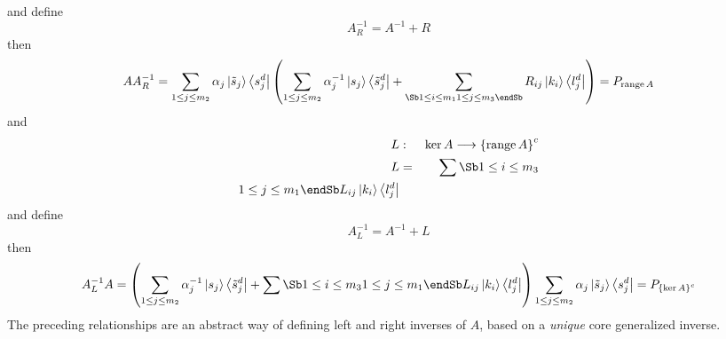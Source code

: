 and define 
\begin{equation}
A_{R}^{-1}=A^{-1}+R
\end{equation}%
then 
\begin{equation}
AA_{R}^{-1}=\sum_{1\leq j\leq m_{2}}\alpha _{j}\left\vert \tilde{s}%
_{j}\right\rangle \left\langle s_{j}^{d}\right\vert \left( \sum_{1\leq j\leq
m_{2}}\alpha _{j}^{-1}\left\vert s_{j}\right\rangle \left\langle \tilde{s}%
_{j}^{d}\right\vert +\sum_{\Sb 1\leq i\leq m_{1}  \\ 1\leq j\leq m_{3} 
\endSb }R_{ij}\left\vert k_{i}\right\rangle \left\langle
l_{j}^{d}\right\vert \right) =P_{%
\mathop{\rm range}%
A}
\end{equation}%
and 
\begin{eqnarray}
L &:&\ker A\longrightarrow \left\{ 
\mathop{\rm range}%
A\right\} ^{c}  \nonumber \\
L &=&\sum\Sb 1\leq i\leq m_{3}  \\ 1\leq j\leq m_{1}  \endSb %
L_{ij}\left\vert k_{i}\right\rangle \left\langle l_{j}^{d}\right\vert
\end{eqnarray}%
and define 
\begin{equation}
A_{L}^{-1}=A^{-1}+L
\end{equation}%
then 
\begin{equation}
A_{L}^{-1}A=\left( \sum_{1\leq j\leq m_{2}}\alpha _{j}^{-1}\left\vert
s_{j}\right\rangle \left\langle \tilde{s}_{j}^{d}\right\vert +\sum\Sb 1\leq
i\leq m_{3}  \\ 1\leq j\leq m_{1}  \endSb L_{ij}\left\vert
k_{i}\right\rangle \left\langle l_{j}^{d}\right\vert \right) \sum_{1\leq
j\leq m_{2}}\alpha _{j}\left\vert \tilde{s}_{j}\right\rangle \left\langle
s_{j}^{d}\right\vert =P_{\left\{ \ker A\right\} ^{c}}
\end{equation}%
The preceding relationships are an abstract way of defining left and right
inverses of $A$, based on a {\em unique} core generalized inverse.

